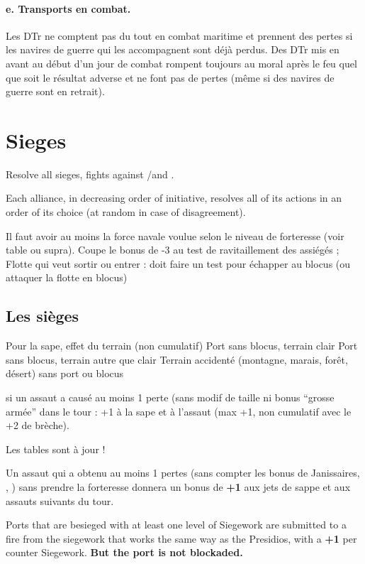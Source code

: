 \paragraph{e. Transports en combat.}
Les DTr ne comptent pas du tout en combat maritime et prennent des pertes si les
navires de guerre qui les accompagnent sont déjà perdus.
Des DTr mis en avant au début d'un jour de combat rompent toujours au moral
après le feu quel que soit le résultat adverse et ne font pas de pertes (même si des
navires de guerre sont en retrait).

\section{Sieges}
Resolve all sieges, fights against \REVOLT/\REBELLION and \corsaire.

Each alliance, in decreasing order of initiative, resolves all of its actions
in an order of its choice (at random in case of disagreement).

\aparag[Blocus]
Il faut avoir au moins la force navale voulue selon le niveau de forteresse
(voir table ou supra).
\bparag Coupe le bonus de -3 au test de ravitaillement des assiégés ;
\bparag Flotte qui veut sortir ou entrer : doit faire un test pour échapper au blocus
(ou attaquer la flotte en blocus)

\subsection{Les sièges}
\aparag Pour la sape, effet du terrain (non cumulatif)
      Port sans blocus, terrain clair
      Port sans blocus, terrain autre que clair
 Terrain accidenté (montagne, marais, forêt, désert) sans port
ou blocus

\aparag[TBD] si un assaut a causé au moins 1 perte (sans modif de
taille ni bonus ``grosse armée'' dans le tour : +1 à la sape et à
l'assaut (max +1, non cumulatif avec le +2 de brèche).


\aparag Les tables sont à jour !

\aparag[Expérimental]
Un assaut qui a obtenu au moins 1 pertes (sans compter les bonus
de Janissaires, \RUS, \POL) sans prendre la forteresse donnera un
bonus de {\bf +1} aux jets de sappe et aux assauts suivants du tour.

Ports that are besieged with at least one level of Siegework are
submitted to a fire from the siegework that works the same way as the
Presidios, with a {\bf +1} per counter Siegework\faceplus.  {\bf But the
 port is not blockaded.}

